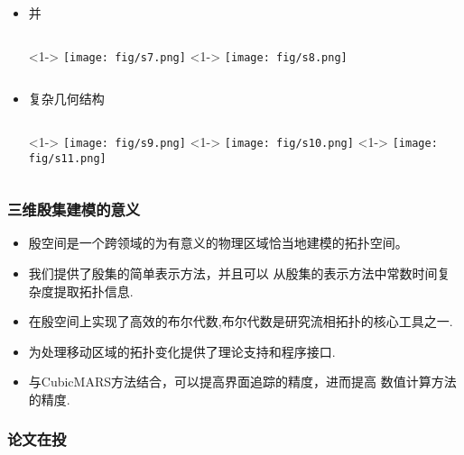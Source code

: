 \documentclass[UTF8]{ctexbeamer}	%
\theoremstyle{plain}
\theoremstyle{definition}
\theoremstyle{remark}
\numberwithin{equation}{section}
\begin{document}
\begin{frame}
    \begin{itemize}
        \item 并 \begin{columns}
            <1->
                \texttt{[image: fig/s7.png]}
            <1->
            \texttt{[image: fig/s8.png]}
        \end{columns}
        \item 复杂几何结构
        \begin{columns}
            <1->
                \texttt{[image: fig/s9.png]}
            <1->
            \texttt{[image: fig/s10.png]}
            <1->
            \texttt{[image: fig/s11.png]}
        \end{columns}
    \end{itemize}
\end{frame}

\begin{frame}
    \frametitle{三维殷集建模的意义}
    \begin{itemize}
        \item 殷空间是一个跨领域的为有意义的物理区域恰当地建模的拓扑空间。
        \item 我们提供了殷集的简单表示方法，并且可以
        从殷集的表示方法中常数时间复杂度提取拓扑信息.
        \item 在殷空间上实现了高效的布尔代数,布尔代数是研究流相拓扑的核心工具之一.
        \item 为处理移动区域的拓扑变化提供了理论支持和程序接口.
        \item 与CubicMARS方法结合，可以提高界面追踪的精度，进而提高
        数值计算方法的精度.
        \end{itemize}
\end{frame}

\begin{frame}
    \frametitle{论文在投}
\end{frame}
\end{document}
